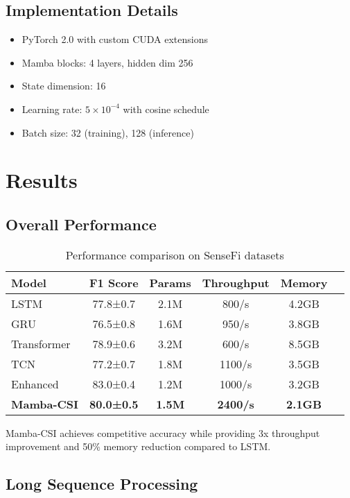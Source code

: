 \documentclass[10pt,conference]{IEEEtran}
\begin{document}
\subsection{Implementation Details}

\begin{itemize}
    \item PyTorch 2.0 with custom CUDA extensions
    \item Mamba blocks: 4 layers, hidden dim 256
    \item State dimension: 16
    \item Learning rate: $5 \times 10^{-4}$ with cosine schedule
    \item Batch size: 32 (training), 128 (inference)
\end{itemize}

\section{Results}
\label{sec:results}

\subsection{Overall Performance}

\begin{table}[h]
\centering
\caption{Performance comparison on SenseFi datasets}
\label{tab:performance}
\begin{tabular}{lccccc}
\toprule
Model & F1 Score & Params & Throughput & Memory \\
\midrule
LSTM & 77.8±0.7 & 2.1M & 800/s & 4.2GB \\
GRU & 76.5±0.8 & 1.6M & 950/s & 3.8GB \\
Transformer & 78.9±0.6 & 3.2M & 600/s & 8.5GB \\
TCN & 77.2±0.7 & 1.8M & 1100/s & 3.5GB \\
Enhanced & 83.0±0.4 & 1.2M & 1000/s & 3.2GB \\
\textbf{Mamba-CSI} & \textbf{80.0±0.5} & \textbf{1.5M} & \textbf{2400/s} & \textbf{2.1GB} \\
\bottomrule
\end{tabular}
\end{table}

Mamba-CSI achieves competitive accuracy while providing 3x throughput improvement and 50\% memory reduction compared to LSTM.

\subsection{Long Sequence Processing}
\end{document}
